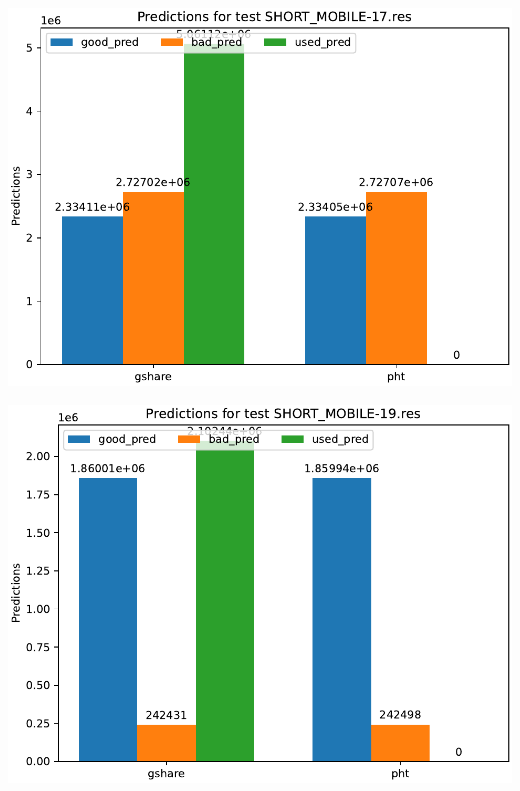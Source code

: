\documentclass[a4paper]{article}
\begin{document}
\begin{minipage}{.48\linewidth}
\includegraphics[width=\linewidth]{graphs/dual-predictor/preds_SHORT_MOBILE-17.res.pdf}
\end{minipage}%
\hfill
\begin{minipage}{.48\linewidth}
\includegraphics[width=\linewidth]{graphs/dual-predictor/preds_SHORT_MOBILE-19.res.pdf}
\end{minipage}
\end{document}
